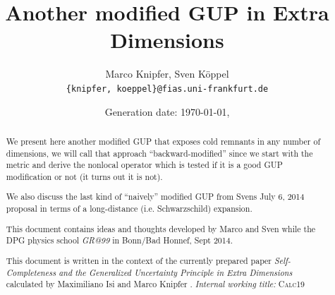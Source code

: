 \documentclass[10pt,a4paper]{article}
\title{Another modified GUP in Extra Dimensions}
\author{Marco Knipfer, Sven Köppel \\
\texttt{\{knipfer, koeppel\}@fias.uni-frankfurt.de}}
\date{Generation date: \today, \currenttime}
\begin{document}
\maketitle

\renewcommand{\d}{\mathrm{d}}
\newcommand{\dd}[2]{\frac{\mathrm{d} #1}{\mathrm{d} #2}}
\newcommand{\pp}[2]{\frac{\partial #1}{\partial #2}}
\newcommand{\dann}{$\rightarrow~$}
\newcommand{\CA}{ {\cal A}}
\newcommand{\C}[1]{ {\cal #1} }
\newcommand{\mn}{_{\mu\nu}}
\newcommand{\bv}[1]{ \mathbf{ #1 } } %

\newcommand{\rb}{\frac{r}{\sqrt{\beta}}}
\newcommand{\rbb}{\nicefrac{r}{\sqrt{\beta}}}

\newcommand*{\mathcolor}{}
\def\mathcolor#1#{\mathcoloraux{#1}}
\newcommand*{\mathcoloraux}[3]{%
  \protect\leavevmode
  \begingroup
    \color#1{#2}#3%
  \endgroup
}
\newcommand{\redmin}{\mathcolor{red}{-}}
\newcommand{\redplus}{\mathcolor{red}{+}}
\newcommand{\pn}{\mathcolor{OliveGreen}{+ n}}
\newcommand{\n}{ {\mathcolor{OliveGreen}{n}} }

\begin{abstract}
We present here another modified GUP that exposes cold remnants in any number of dimensions, we will call that approach ``backward-modified'' since we start with the metric and derive the nonlocal operator which is tested if it is a good GUP modification or not (it turns out it is not).

We also discuss the last kind of ``naively'' modified GUP from Svens July 6, 2014 proposal in terms of a long-distance (i.e. Schwarzschild) expansion.

This document contains ideas and thoughts developed by Marco and Sven while the DPG physics school \emph{GR@99} in Bonn/Bad Honnef, Sept 2014.

This document is written in the context of the currently prepared paper \textit{Self-Completeness and the Generalized Uncertainty Principle in Extra Dimensions} calculated by Maximiliano Isi and Marco Knipfer \cite{work}.
\hfill\textit{Internal working title:} \textsc{Calc19}
\end{abstract}


\tableofcontents


\newpage

\end{document}
